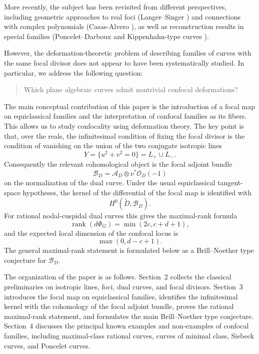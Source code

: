 \documentclass[11pt]{amsart}
\theoremstyle{definition}
\theoremstyle{remark}
\newcommand{\A}{\mathcal{A}}
\newcommand{\B}{\mathcal{B}}
\begin{document}
More recently, the subject has been revisited from different perspectives, including geometric approaches to real foci
(Langer--Singer \cite{LS})  and connections with complex polynomials (Casas-Alvero \cite{CA1, CA2}), as well as reconstruction results in special
families (Poncelet--Darboux \cite{Hunziker} and Kippenhahn-type curves \cite{Ki}).

However, the deformation-theoretic problem of describing families of curves with the same focal divisor does not appear to have been systematically studied. In particular, we address the following question:

\begin{quote}
Which plane algebraic curves admit nontrivial confocal deformations?
\end{quote}

The main conceptual contribution of this paper is the introduction of a focal map on equiclassical families and the interpretation of confocal families as its fibers. This allows us to study confocality using deformation theory.  The key point is that, over the reals, the infinitesimal condition of fixing the focal divisor is  the condition of vanishing  on the union of the two conjugate isotropic lines
\[
Y=\{u^2+v^2=0\}=L_+\cup L_-.
\]
Consequently the relevant cohomological object is the focal adjoint bundle
\[
\B_D=\A_D\otimes \nu^*\mathcal O_D(-1)
\]
on the normalization of the dual curve.  Under the usual equiclassical tangent-space hypotheses, the kernel of the differential of the focal map is identified with
\[
H^0(\widetilde D,\B_D).
\]
For rational nodal-cuspidal dual curves this gives the maximal-rank formula
\[
\operatorname{rank}(d\Phi_G)=\min(2c,c+d+1),
\]
and the expected local dimension of the confocal locus is
\[
\max(0,d-c+1).
\]
The general maximal-rank statement is formulated below as a Brill--Noether type conjecture for \(\B_D\).

\medskip

The organization of the paper is as follows. Section~2 collects the classical preliminaries on isotropic lines, foci, dual curves, and focal divisors. Section~3 introduces the focal map on equiclassical families, identifies the infinitesimal kernel with the cohomology of the focal adjoint bundle, proves the rational maximal-rank statement, and formulates the main Brill--Noether type conjecture. Section~4 discusses the principal known examples and non-examples of confocal families, including maximal-class rational curves, curves of minimal class, Siebeck curves, and Poncelet curves.
\end{document}
